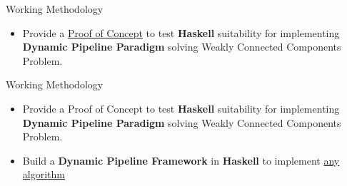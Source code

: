 
\begin{frame}[fragile]{Working Methodology}
  \begin{itemize}
    \item Provide a \underline{\color{red}Proof of Concept} to test \textbf{Haskell} suitability for implementing  \textbf{Dynamic Pipeline Paradigm} solving Weakly Connected Components Problem.
  \end{itemize}   
\end{frame}

\begin{frame}[fragile]{Working Methodology}
    \begin{itemize}
      \setlength\itemsep{1.5em}
      \item {\color{light}Provide a Proof of Concept to test \textbf{Haskell} suitability for implementing  \textbf{Dynamic Pipeline Paradigm} solving Weakly Connected Components Problem.}
      \item Build a \textbf{Dynamic Pipeline Framework} in \textbf{Haskell} to implement \underline{\color{red}any algorithm}
  \end{itemize}   
\end{frame}


